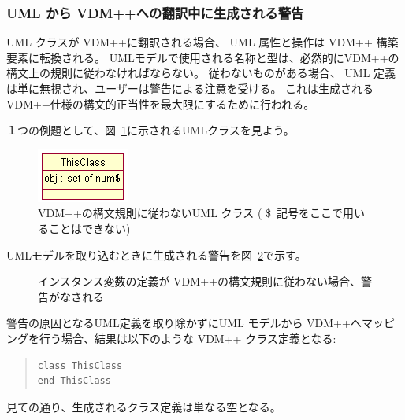 \documentclass[\pformat,12pt]{jarticle}
\newcommand{\vdmpp}{VDM++}
\begin{document}
\subsubsection*{ UML から \vdmpp{}への翻訳中に生成される警告}


 UML クラスが \vdmpp{}に翻訳される場合、 UML 属性と操作は \vdmpp{} 構築要素に転換される。
UMLモデルで使用される名称と型は、必然的に\vdmpp{}の構文上の規則に従わなければならない。
従わないものがある場合、 UML 定義は単に無視され、ユーザーは警告による注意を受ける。
これは生成される \vdmpp{}仕様の構文的正当性を最大限にするために行われる。

１つの例題として、図~\ref{fig:noncompliance}に示されるUMLクラスを見よう。

\begin{figure}[htb]
\begin{center}
\mbox{}
\vspace{0.5cm}
\includegraphics{noncompliance}
\caption{\vdmpp{}の構文規則に従わないUML クラス ( \$\ 記号をここで用いることはできない)　\label{fig:noncompliance}}
\end{center}
\end{figure}

UMLモデルを取り込むときに生成される警告を図~\ref{fig:warning}で示す。

\begin{figure}[htb]
\begin{center}
\mbox{}
\vspace{0.5cm}
\caption{インスタンス変数の定義が \vdmpp{}の構文規則に従わない場合、警告がなされる　\label{fig:warning}}
\end{center}
\end{figure}
 警告の原因となるUML定義を取り除かずにUML モデルから \vdmpp{}へマッピングを行う場合、結果は以下のような \vdmpp{} クラス定義となる:

\begin{quote}
\begin{verbatim}
class ThisClass
end ThisClass
\end{verbatim}
\end{quote}

見ての通り、生成されるクラス定義は単なる空となる。
\end{document}
